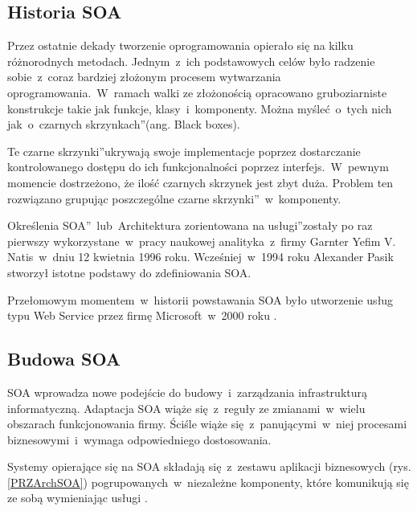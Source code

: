 \subsection{Historia SOA}
Przez ostatnie dekady tworzenie oprogramowania opierało się na kilku różnorodnych metodach. Jednym~z~ich podstawowych celów było radzenie sobie~z~coraz bardziej złożonym procesem wytwarzania oprogramowania.~W~ramach walki ze złożonością opracowano gruboziarniste konstrukcje takie jak funkcje, klasy~i~komponenty. Można myśleć~o~tych nich jak~o~\quotedblbase czarnych skrzynkach\textquotedblright (ang. Black boxes). 

Te \quotedblbase czarne skrzynki\textquotedblright ukrywają swoje implementacje poprzez dostarczanie kontrolowanego dostępu do ich funkcjonalności poprzez interfejs.~W~pewnym momencie dostrzeżono, że ilość czarnych skrzynek jest zbyt duża. Problem ten rozwiązano grupując poszczególne \quotedblbase czarne skrzynki\textquotedblright~w~komponenty. \cite{SteveMichSOA} 

Określenia \quotedblbase SOA\textquotedblright ~lub~\quotedblbase Architektura zorientowana na usługi\textquotedblright zostały po raz pierwszy wykorzystane~w~pracy naukowej analityka~z~firmy Garnter Yefim V. Natis~w~dniu 12 kwietnia 1996 roku. Wcześniej~w~1994 roku Alexander Pasik stworzył istotne podstawy do zdefiniowania SOA. 

Przełomowym momentem~w~historii powstawania SOA było utworzenie usług typu Web Service przez firmę Microsoft~w~2000 roku \cite{JosSOAHist}.

\subsection{Budowa SOA}
SOA wprowadza nowe podejście do budowy~i~zarządzania infrastrukturą informatyczną. Adaptacja SOA wiąże się~z~reguły ze zmianami~w~wielu obszarach funkcjonowania firmy. Ściśle wiąże się~z~panującymi~w~niej procesami biznesowymi~i~wymaga odpowiedniego dostosowania.

Systemy opierające się na SOA składają się~z~zestawu aplikacji biznesowych (rys. \ref{PRZArchSOA}) pogrupowanych~w~niezależne komponenty, które komunikują się ze sobą wymieniając usługi \cite{SOAwJBBC}. 

